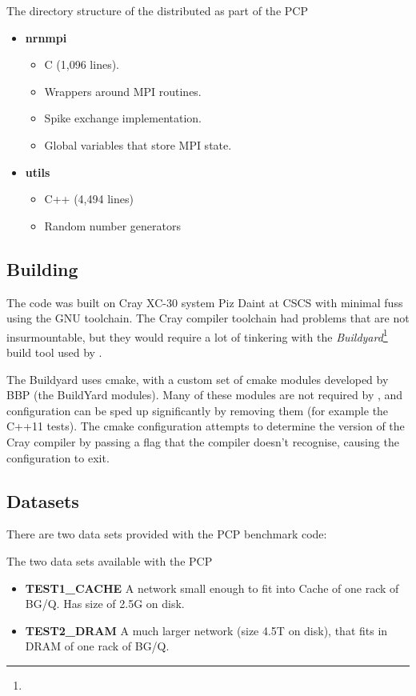 \begin{infobox}{The directory structure of the \neuron distributed as part of the PCP}
\begin{itemize}[leftmargin=*]
    \item \textbf{nrnmpi}
    \begin{itemize}
        \item C (1,096 lines).
        \item Wrappers around MPI routines.
        \item Spike exchange implementation.
        \item Global variables that store MPI state.
    \end{itemize}

    \item \textbf{utils}
    \begin{itemize}
        \item C++ (4,494 lines)
        \item Random number generators
    \end{itemize}
\end{itemize}
\end{infobox}

\subsection{Building}
The code was built on Cray XC-30 system Piz Daint at CSCS with minimal fuss using the GNU toolchain.
The Cray compiler toolchain had problems that are not insurmountable, but they would require a lot of tinkering with the \emph{Buildyard}\footnote{} build tool used by \neuron.

The Buildyard uses cmake, with a custom set of cmake modules developed by BBP (the BuildYard modules). Many of these modules are not required by \neuron, and configuration can be sped up significantly by removing them (for example the C++11 tests). The cmake configuration attempts to determine the version of the Cray compiler by passing a flag that the compiler doesn't recognise, causing the configuration to exit.

\subsection{Datasets}
There are two data sets provided with the PCP benchmark code:
\begin{infobox}{The two data sets available with the PCP}
\begin{itemize}[leftmargin=*]
    \item \textbf{TEST1\_CACHE} A network small enough to fit into Cache of one rack of BG/Q. Has size of 2.5G on disk.
    \item \textbf{TEST2\_DRAM} A much larger network (size 4.5T on disk), that fits in DRAM of one rack of BG/Q.
\end{itemize}
\end{infobox}


